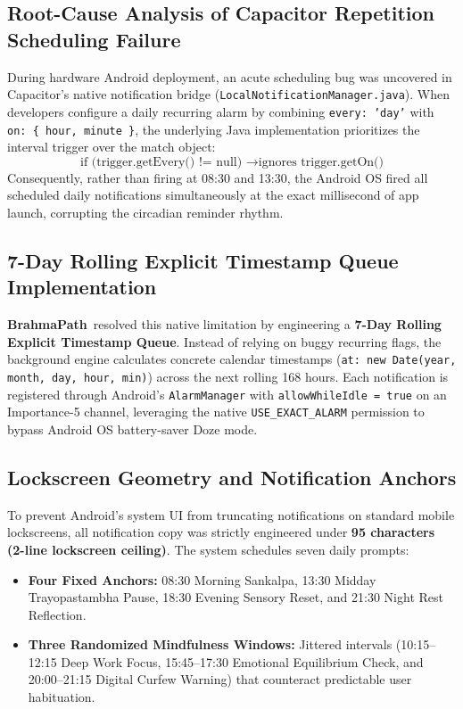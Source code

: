 \documentclass[11pt,a4paper]{article}
\newcommand{\AppName}{\textbf{BrahmaPath}}
\begin{document}
\subsection{Root-Cause Analysis of Capacitor Repetition Scheduling Failure}
During hardware Android deployment, an acute scheduling bug was uncovered in Capacitor's native notification bridge (\texttt{LocalNotificationManager.java}). When developers configure a daily recurring alarm by combining \texttt{every: 'day'} with \texttt{on: \{ hour, minute \}}, the underlying Java implementation prioritizes the interval trigger over the match object:
\begin{equation}
    \text{if (trigger.getEvery() != null) } \longrightarrow \text{ignores } \text{trigger.getOn()}
\end{equation}
Consequently, rather than firing at 08:30 and 13:30, the Android OS fired all scheduled daily notifications simultaneously at the exact millisecond of app launch, corrupting the circadian reminder rhythm.

\subsection{7-Day Rolling Explicit Timestamp Queue Implementation}
\AppName\ resolved this native limitation by engineering a \textbf{7-Day Rolling Explicit Timestamp Queue}. Instead of relying on buggy recurring flags, the background engine calculates concrete calendar timestamps (\texttt{at: new Date(year, month, day, hour, min)}) across the next rolling 168 hours. Each notification is registered through Android's \texttt{AlarmManager} with \texttt{allowWhileIdle = true} on an Importance-5 channel, leveraging the native \texttt{USE\_EXACT\_ALARM} permission to bypass Android OS battery-saver Doze mode.

\subsection{Lockscreen Geometry and Notification Anchors}
To prevent Android's system UI from truncating notifications on standard mobile lockscreens, all notification copy was strictly engineered under \textbf{95 characters (2-line lockscreen ceiling)}. The system schedules seven daily prompts:
\begin{itemize}[leftmargin=*]
    \item \textbf{Four Fixed Anchors:} 08:30 Morning Sankalpa, 13:30 Midday Trayopastambha Pause, 18:30 Evening Sensory Reset, and 21:30 Night Rest Reflection.
    \item \textbf{Three Randomized Mindfulness Windows:} Jittered intervals (10:15--12:15 Deep Work Focus, 15:45--17:30 Emotional Equilibrium Check, and 20:00--21:15 Digital Curfew Warning) that counteract predictable user habituation.
\end{itemize}
\end{document}
